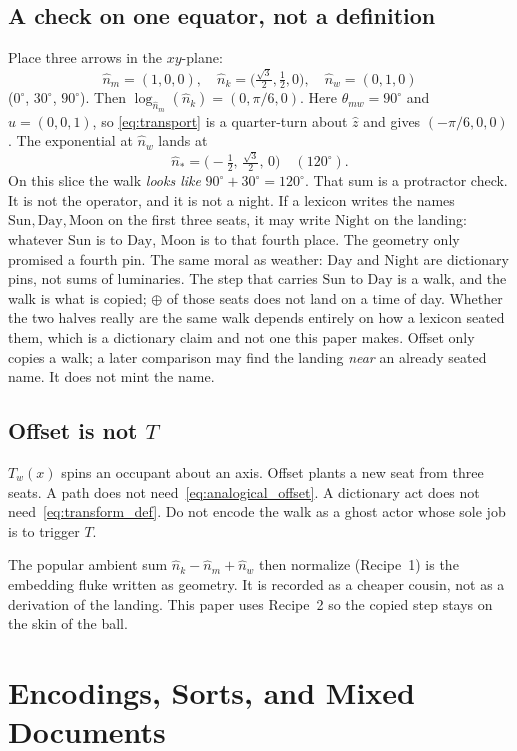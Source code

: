 \documentclass[12pt, a4paper]{article}
\begin{document}
\subsection{A check on one equator, not a definition}
\label{subsec:offset_equator}
Place three arrows in the $xy$-plane:
\[
\hat n_m=(1,0,0),\quad
\hat n_k=\bigl(\tfrac{\sqrt{3}}{2},\tfrac12,0\bigr),\quad
\hat n_w=(0,1,0)
\]
($0^\circ$, $30^\circ$, $90^\circ$). Then
$\log_{\hat n_m}(\hat n_k)=(0,\pi/6,0)$.
Here $\theta_{mw}=90^\circ$ and $\hat u=(0,0,1)$, so
\eqref{eq:transport} is a quarter-turn about $\hat z$ and gives
$(-\pi/6,0,0)$. The exponential at
$\hat n_w$ lands at
\[
\hat n_{*}=\bigl(-\tfrac12,\,\tfrac{\sqrt{3}}{2},\,0\bigr)
\quad (120^\circ).
\]
On this slice the walk \emph{looks like} $90^\circ+30^\circ=120^\circ$.
That sum is a protractor check. It is not the operator, and it is
not a night. If a lexicon writes the names
$\mathrm{Sun},\mathrm{Day},\mathrm{Moon}$ on the first three seats,
it may write $\mathrm{Night}$ on the landing: whatever $\mathrm{Sun}$
is to $\mathrm{Day}$, $\mathrm{Moon}$ is to that fourth place. The
geometry only promised a fourth pin.
The same moral as weather: $\mathrm{Day}$ and $\mathrm{Night}$
are dictionary pins, not sums of luminaries. The step that carries
$\mathrm{Sun}$ to $\mathrm{Day}$ is a walk, and the walk is what is
copied; $\oplus$ of those seats does not land on a time of day.
Whether the two halves really are the same walk depends entirely on
how a lexicon seated them, which is a dictionary claim and not one
this paper makes. Offset only copies a walk; a later comparison
may find the landing \emph{near} an already seated name. It does
not mint the name.

\subsection{Offset is not $T$}
\label{subsec:offset_not_T}
$T_w(x)$ spins an occupant about an axis. Offset plants a new seat
from three seats. A path does not need~\eqref{eq:analogical_offset}.
A dictionary act does not need~\eqref{eq:transform_def}. Do not
encode the walk as a ghost actor whose sole job is to trigger $T$.

The popular ambient sum $\hat n_k-\hat n_m+\hat n_w$ then
normalize (Recipe~1) is the embedding fluke written as geometry.
It is recorded as a cheaper cousin, not as a derivation of the
landing. This paper uses Recipe~2 so the copied step
stays on the skin of the ball.

\section{Encodings, Sorts, and Mixed Documents}
\label{sec:encodings_sorts}
\end{document}
